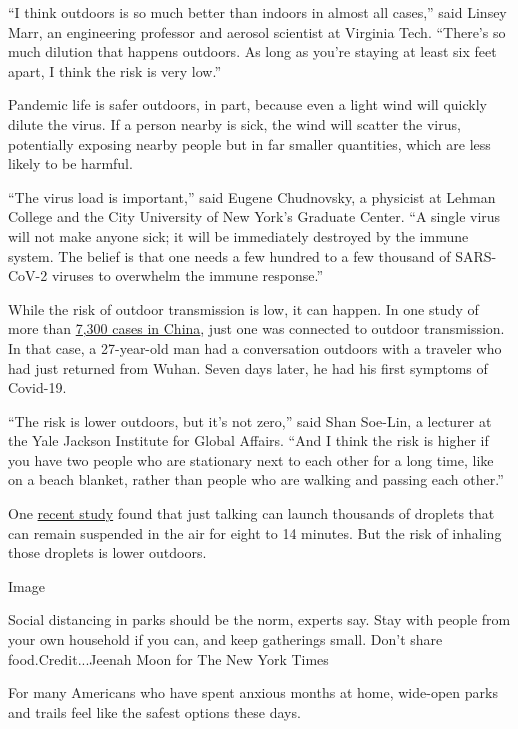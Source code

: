 ``I think outdoors is so much better than indoors in almost all cases,''
said Linsey Marr, an engineering professor and aerosol scientist at
Virginia Tech. ``There's so much dilution that happens outdoors. As long
as you're staying at least six feet apart, I think the risk is very
low.''

Pandemic life is safer outdoors, in part, because even a light wind will
quickly dilute the virus. If a person nearby is sick, the wind will
scatter the virus, potentially exposing nearby people but in far smaller
quantities, which are less likely to be harmful.

``The virus load is important,'' said Eugene Chudnovsky, a physicist at
Lehman College and the City University of New York's Graduate Center.
``A single virus will not make anyone sick; it will be immediately
destroyed by the immune system. The belief is that one needs a few
hundred to a few thousand of SARS-CoV-2 viruses to overwhelm the immune
response.''

While the risk of outdoor transmission is low, it can happen. In one
study of more than
\href{https://www.medrxiv.org/content/10.1101/2020.04.04.20053058v1.full.pdf}{7,300
cases in China}, just one was connected to outdoor transmission. In that
case, a 27-year-old man had a conversation outdoors with a traveler who
had just returned from Wuhan. Seven days later, he had his first
symptoms of Covid-19.

``The risk is lower outdoors, but it's not zero,'' said Shan Soe-Lin, a
lecturer at the Yale Jackson Institute for Global Affairs. ``And I think
the risk is higher if you have two people who are stationary next to
each other for a long time, like on a beach blanket, rather than people
who are walking and passing each other.''

One
\href{https://www.nytimes3xbfgragh.onion/2020/05/14/health/coronavirus-infections.html}{recent
study} found that just talking can launch thousands of droplets that can
remain suspended in the air for eight to 14 minutes. But the risk of
inhaling those droplets is lower outdoors.

Image

Social distancing in parks should be the norm, experts say. Stay with
people from your own household if you can, and keep gatherings small.
Don't share food.Credit...Jeenah Moon for The New York Times

For many Americans who have spent anxious months at home, wide-open
parks and trails feel like the safest options these days.

